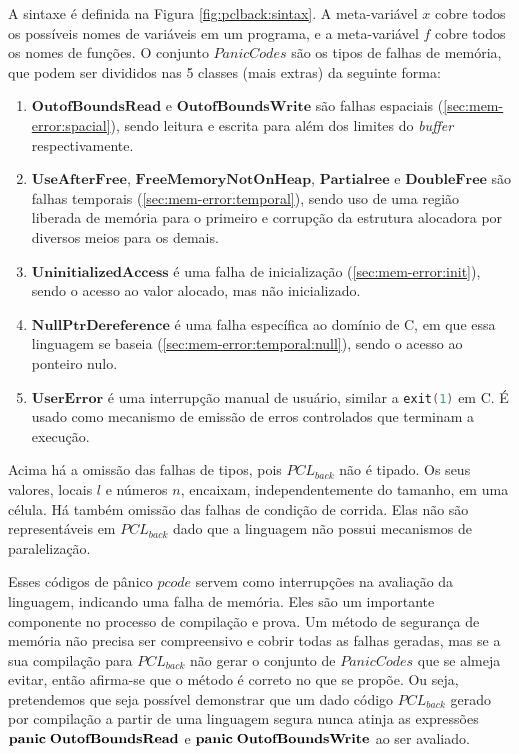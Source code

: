A sintaxe é definida na Figura \ref{fig:pclback:sintax}. A meta-variável $x$ cobre todos os possíveis nomes de variáveis em um programa, e a meta-variável $f$ cobre todos os nomes de funções. O conjunto $PanicCodes$ são os tipos de falhas de memória, que podem ser divididos nas 5 classes (mais extras) da seguinte forma:
\begin{enumerate}
	\item $\mathbf{OutofBoundsRead}$ e $\mathbf{OutofBoundsWrite}$ são falhas espaciais (\ref{sec:mem-error:spacial}), sendo leitura e escrita para além dos limites do \emph{buffer} respectivamente.
	\item $\mathbf{UseAfterFree}$, $\mathbf{FreeMemoryNotOnHeap}$, $\mathbf{Partial ree}$ e $\mathbf{Double Free}$ são falhas temporais (\ref{sec:mem-error:temporal}), sendo uso de uma região liberada de memória para o primeiro e corrupção da estrutura alocadora por diversos meios para os demais.
	\item $\mathbf{UninitializedAccess}$ é uma falha de inicialização (\ref{sec:mem-error:init}), sendo o acesso ao valor alocado, mas não inicializado. 
	\item $\mathbf{NullPtrDereference}$ é uma falha específica ao domínio de C, em que essa linguagem se baseia (\ref{sec:mem-error:temporal:null}), sendo o acesso ao ponteiro nulo.
	\item $\mathbf{UserError}$ é uma interrupção manual de usuário, similar a \lstinline[language=C]|exit(1)| em C. É usado como mecanismo de emissão de erros controlados que terminam a execução.
\end{enumerate}

\noindent Acima há a omissão das falhas de tipos, pois $PCL_{back}$ não é tipado. Os seus valores, locais $l$ e números $n$, encaixam, independentemente do tamanho, em uma célula. Há também omissão das falhas de condição de corrida. Elas não são representáveis em $PCL_{back}$ dado que a linguagem não possui mecanismos de paralelização.

Esses códigos de pânico $pcode$ servem como interrupções na avaliação da linguagem, indicando uma falha de memória. Eles são um importante componente no processo de compilação e prova. Um método de segurança de memória não precisa ser compreensivo e cobrir todas as falhas geradas, mas se a sua compilação para $PCL_{back}$ não gerar o conjunto de $PanicCodes$ que se almeja evitar, então afirma-se que o método é correto no que se propõe. Ou seja, pretendemos que seja possível demonstrar que um dado código $PCL_{back}$ gerado por compilação a partir de uma linguagem segura nunca atinja as expressões $\mathbf{panic}\;\mathbf{OutofBoundsRead}$ e $\mathbf{panic}\;\mathbf{OutofBoundsWrite}$ ao ser avaliado.


